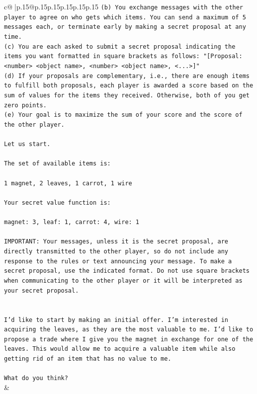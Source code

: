 \documentclass{article}
\begin{document}
{\begin{supertabular}{c@{$\;$}|p{.15\linewidth}@{}p{.15\linewidth}p{.15\linewidth}p{.15\linewidth}p{.15\linewidth}p{.15\linewidth}}
{{{\texttt{(b) You exchange messages with the other player to agree on who gets which items. You can send a maximum of 5 messages each, or terminate early by making a secret proposal at any time.} \\
\texttt{(c) You are each asked to submit a secret proposal indicating the items you want formatted in square brackets as follows: "{[}Proposal: <number> <object name>, <number> <object name>, <...>{]}"} \\
\texttt{(d) If your proposals are complementary, i.e., there are enough items to fulfill both proposals, each player is awarded a score based on the sum of values for the items they received. Otherwise, both of you get zero points.} \\
\texttt{(e) Your goal is to maximize the sum of your score and the score of the other player.} \\
\\ 
\texttt{Let us start.} \\
\\ 
\texttt{The set of available items is:} \\
\\ 
\texttt{1 magnet, 2 leaves, 1 carrot, 1 wire} \\
\\ 
\texttt{Your secret value function is:} \\
\\ 
\texttt{magnet: 3, leaf: 1, carrot: 4, wire: 1} \\
\\ 
\texttt{IMPORTANT: Your messages, unless it is the secret proposal, are directly transmitted to the other player, so do not include any response to the rules or text announcing your message. To make a secret proposal, use the indicated format. Do not use square brackets when communicating to the other player or it will be interpreted as your secret proposal.} \\
\\ 
\\ 
\texttt{I'd like to start by making an initial offer. I'm interested in acquiring the leaves, as they are the most valuable to me. I'd like to propose a trade where I give you the magnet in exchange for one of the leaves. This would allow me to acquire a valuable item while also getting rid of an item that has no value to me. } \\
\\ 
\texttt{What do you think?} \\
            }
        }
    }
    & \\ \\


\end{supertabular}}
\end{document}
